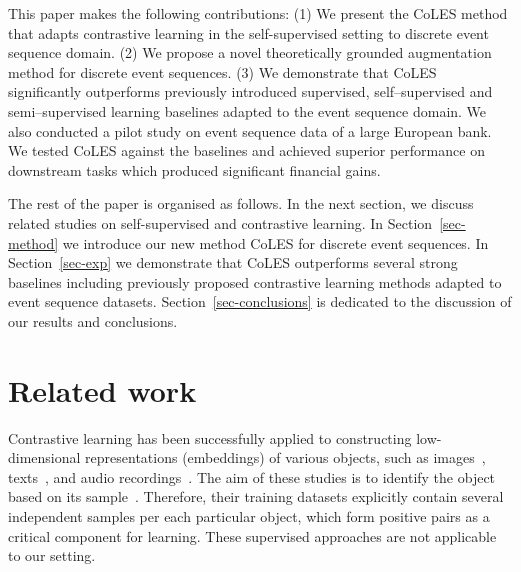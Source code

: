 \documentclass{article}
\begin{document}
This paper makes the following contributions: (1) We present the CoLES method that adapts contrastive learning in the self-supervised setting to discrete event sequence domain. (2) We propose a novel theoretically grounded augmentation method for discrete event sequences. (3) We demonstrate that CoLES significantly outperforms previously introduced supervised, self--supervised and semi--supervised learning baselines adapted to the event sequence domain. We also conducted a pilot study on event sequence data 
of a large European bank. We tested CoLES against the baselines and achieved superior performance on downstream tasks which produced significant financial gains. %

The rest of the paper is organised as follows. In the next section, we discuss related studies on self-supervised and contrastive learning. In Section~\ref{sec-method} we introduce our new method CoLES for discrete event sequences. In Section~\ref{sec-exp} we demonstrate that CoLES outperforms several strong baselines including previously proposed contrastive learning methods adapted to event sequence datasets. Section~\ref{sec-conclusions} is dedicated to the discussion of our results and conclusions.

\section{Related work} \label{sec-rel-work}

Contrastive learning has been successfully applied to constructing low-dimensional representations (embeddings) of various objects, such as images~\citep{Chopra2005LearningAS, Schroff2015FaceNetAU}, texts~\citep{Reimers2019SentenceBERTSE}, and audio recordings~\citep{Wan2018GeneralizedEL}.
The aim of these studies is to identify the object based on its sample~\citep{Schroff2015FaceNetAU, Hu2014DiscriminativeDM, Wan2018GeneralizedEL}. Therefore, their training datasets explicitly contain several independent samples per each particular object, which form positive pairs as a critical component for learning. These supervised approaches are not applicable to our setting.
\end{document}
